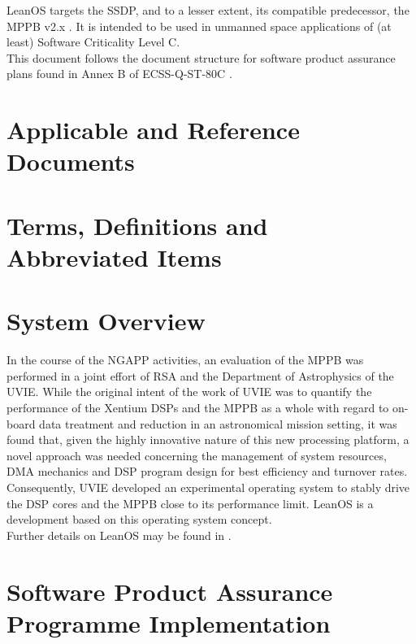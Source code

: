 \noindent
LeanOS targets the \gls{SSDP}, and to a lesser extent, its
compatible predecessor, the \gls{MPPB} v2.x \cite{MPPB}.
It is intended to be used in unmanned space applications of (at least)
Software Criticality Level C. \\

\noindent
This document follows the document structure for software product assurance
plans found in Annex B of ECSS-Q-ST-80C \cite{ECSS80C}.


\chapter{Applicable and Reference Documents} %

\printbibliography[heading=none]


\chapter{Terms, Definitions and Abbreviated Items}
\printglossary[type=acronym]
\printglossary[type=main, style=altlist]


\chapter{System Overview}

In the course of the \gls{NGAPP} activities, an evaluation of the \gls{MPPB}
was performed in a joint effort of \gls{RSA} and the Department of Astrophysics
of the \gls{UVIE}. While the original intent of the work of \gls{UVIE} was to
quantify the performance of the \gls{Xentium} \glspl{DSP} and the \gls{MPPB} as a
whole with regard to on-board data treatment and reduction in an astronomical
mission setting, it was found that, given the highly innovative nature of this new
processing platform, a novel approach was needed concerning the management of
system resources, \gls{DMA} mechanics and \gls{DSP} program design for best
efficiency and turnover rates. Consequently, \gls{UVIE} developed an experimental
operating system to stably drive the \gls{DSP} cores and the \gls{MPPB} close
to its performance limit. LeanOS is a development based on this operating system
concept.\\

\noindent
Further details on LeanOS may be found in \cite{ssdpOS}.


\chapter{Software Product Assurance Programme Implementation}

